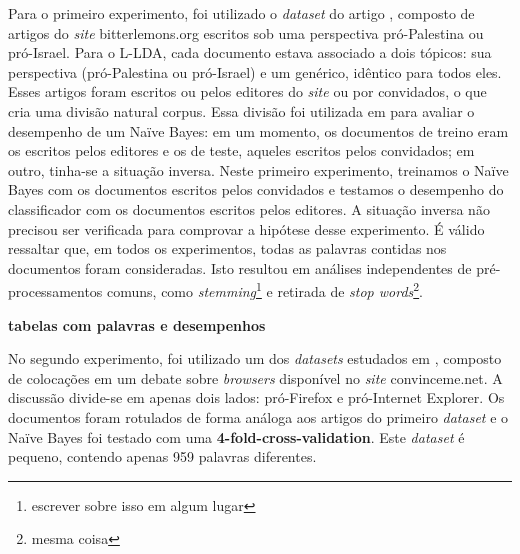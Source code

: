 Para o primeiro experimento, foi utilizado o \emph{dataset} do artigo \cite{lin-et-al2006}, composto de artigos do \emph{site} bitterlemons.org escritos sob uma perspectiva pró-Palestina ou pró-Israel. Para o L-LDA, cada documento estava associado a dois tópicos: sua perspectiva (pró-Palestina ou pró-Israel) e um genérico, idêntico para todos eles. Esses artigos foram escritos ou pelos editores do \emph{site} ou por convidados, o que cria uma divisão natural corpus. Essa divisão foi utilizada em \cite{lin-et-al2006} para avaliar o desempenho de um Naïve Bayes: em um momento, os documentos de treino eram os escritos pelos editores e os de teste, aqueles escritos pelos convidados; em outro, tinha-se a situação inversa. Neste primeiro experimento, treinamos o Naïve Bayes com os documentos escritos pelos convidados e testamos o desempenho do classificador com os documentos escritos pelos editores. A situação inversa não precisou ser verificada para comprovar a hipótese desse experimento. É válido ressaltar que, em todos os experimentos, todas as palavras contidas nos documentos foram consideradas. Isto resultou em análises independentes de pré-processamentos comuns, como \emph{stemming}\footnote{escrever sobre isso em algum lugar} e retirada de \emph{stop words}\footnote{mesma coisa}.

\textbf{tabelas com palavras e desempenhos}


No segundo experimento, foi utilizado um dos \emph{datasets} estudados em \cite{somasundaran}, composto de colocações em um debate sobre \emph{browsers} disponível no \emph{site} convinceme.net. A discussão divide-se em apenas dois lados: pró-Firefox e pró-Internet Explorer. Os documentos foram rotulados de forma análoga aos artigos do primeiro \emph{dataset} e o Naïve Bayes foi testado com uma \textbf{4-fold-cross-validation}. Este \emph{dataset} é pequeno, contendo apenas 959 palavras diferentes. %





